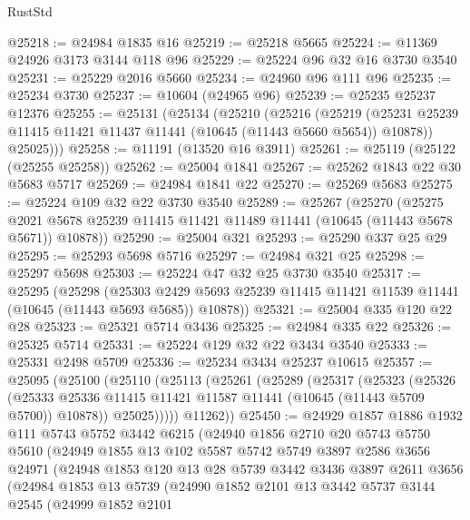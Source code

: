 \begin{lexlean}{RustStd}
\begin{coremodule}
@25218 := @24984 @1835 @16
@25219 := @25218 @5665
@25224 := @11369 @24926 @3173 @3144 @118 @96
@25229 := @25224 @96 @32 @16 @3730 @3540
@25231 := @25229 @2016 @5660
@25234 := @24960 @96 @111 @96
@25235 := @25234 @3730
@25237 := @10604 (@24965 @96)
@25239 := @25235 @25237 @12376
@25255 := @25131
    (@25134
      (@25210
        (@25216
          (@25219 (@25231 @25239 @11415 @11421 @11437 @11441 (@10645 (@11443 @5660 @5654)) @10878))
          @25025)))
@25258 := @11191 (@13520 @16 @3911)
@25261 := @25119 (@25122 (@25255 @25258))
@25262 := @25004 @1841
@25267 := @25262 @1843 @22 @30 @5683 @5717
@25269 := @24984 @1841 @22
@25270 := @25269 @5683
@25275 := @25224 @109 @32 @22 @3730 @3540
@25289 := @25267
    (@25270
      (@25275 @2021 @5678 @25239 @11415 @11421 @11489 @11441 (@10645 (@11443 @5678 @5671)) @10878))
@25290 := @25004 @321
@25293 := @25290 @337 @25 @29
@25295 := @25293 @5698 @5716
@25297 := @24984 @321 @25
@25298 := @25297 @5698
@25303 := @25224 @47 @32 @25 @3730 @3540
@25317 := @25295
    (@25298
      (@25303 @2429 @5693 @25239 @11415 @11421 @11539 @11441 (@10645 (@11443 @5693 @5685)) @10878))
@25321 := @25004 @335 @120 @22 @28
@25323 := @25321 @5714 @3436
@25325 := @24984 @335 @22
@25326 := @25325 @5714
@25331 := @25224 @129 @32 @22 @3434 @3540
@25333 := @25331 @2498 @5709
@25336 := @25234 @3434 @25237 @10615
@25357 := @25095
    (@25100
      (@25110
        (@25113
          (@25261
            (@25289
              (@25317
                (@25323
                  (@25326
                    (@25333
                      @25336
                      @11415
                      @11421
                      @11587
                      @11441
                      (@10645 (@11443 @5709 @5700))
                      @10878))
                  @25025)))))
        @11262))
@25450 := @24929
    @1857
    @1886
    @1932
    @111
    @5743
    @5752
    @3442
    @6215
    (@24940
      @1856
      @2710
      @20
      @5743
      @5750
      @5610
      (@24949
        @1855
        @13
        @102
        @5587
        @5742
        @5749
        @3897
        @2586
        @3656
        @24971
        (@24948
          @1853
          @120
          @13
          @28
          @5739
          @3442
          @3436
          @3897
          @2611
          @3656
          (@24984
            @1853
            @13
            @5739
            (@24990
              @1852
              @2101
              @13
              @3442
              @5737
              @3144
              @2545
              (@24999
                @1852
                @2101

\end{coremodule}
\end{lexlean}
